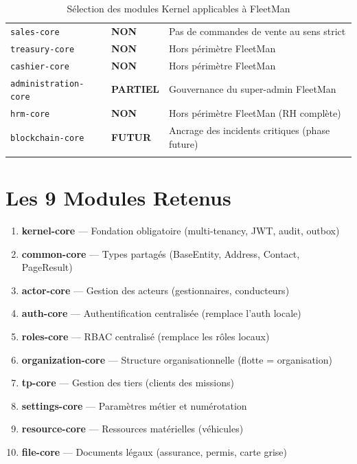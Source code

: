\documentclass[12pt,a4paper]{report}
\begin{document}
\begin{longtable}{p{3.5cm}p{2cm}p{7.5cm}}
\texttt{sales-core} & \textcolor{fleeterror}{\textbf{NON}} & Pas de commandes de vente au sens strict \\
\texttt{treasury-core} & \textcolor{fleeterror}{\textbf{NON}} & Hors périmètre FleetMan \\
\texttt{cashier-core} & \textcolor{fleeterror}{\textbf{NON}} & Hors périmètre FleetMan \\
\texttt{administration-core} & \textcolor{fleetwarning}{\textbf{PARTIEL}} & Gouvernance du super-admin FleetMan \\
\texttt{hrm-core} & \textcolor{fleeterror}{\textbf{NON}} & Hors périmètre FleetMan (RH complète) \\
\texttt{blockchain-core} & \textcolor{fleetwarning}{\textbf{FUTUR}} & Ancrage des incidents critiques (phase future) \\
\bottomrule
\caption{Sélection des modules Kernel applicables à FleetMan}
\end{longtable}

\section{Les 9 Modules Retenus}

\begin{tcolorbox}[colback=kernellight, colframe=kernelcolor, title={\bfseries\color{white} Modules Kernel retenus pour FleetMan}]
\begin{enumerate}[leftmargin=1.5cm]
  \item \textbf{kernel-core} — Fondation obligatoire (multi-tenancy, JWT, audit, outbox)
  \item \textbf{common-core} — Types partagés (BaseEntity, Address, Contact, PageResult)
  \item \textbf{actor-core} — Gestion des acteurs (gestionnaires, conducteurs)
  \item \textbf{auth-core} — Authentification centralisée (remplace l'auth locale)
  \item \textbf{roles-core} — RBAC centralisé (remplace les rôles locaux)
  \item \textbf{organization-core} — Structure organisationnelle (flotte = organisation)
  \item \textbf{tp-core} — Gestion des tiers (clients des missions)
  \item \textbf{settings-core} — Paramètres métier et numérotation
  \item \textbf{resource-core} — Ressources matérielles (véhicules)
  \item \textbf{file-core} — Documents légaux (assurance, permis, carte grise)
\end{enumerate}
\end{tcolorbox}
\end{document}
